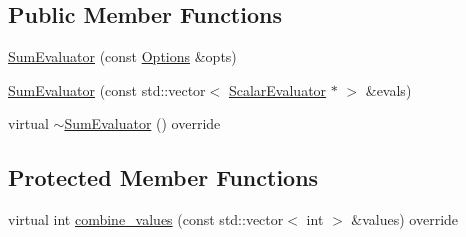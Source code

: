 \subsection*{Public Member Functions}
\begin{DoxyCompactItemize}
\item 
\hyperlink{classSumEvaluator_ad4cbe51a347eab320a300fc5cad68a56}{Sum\-Evaluator} (const \hyperlink{classOptions}{Options} \&opts)
\item 
\hyperlink{classSumEvaluator_a77e17a40880beb1b1f4611baa8440e61}{Sum\-Evaluator} (const std\-::vector$<$ \hyperlink{classScalarEvaluator}{Scalar\-Evaluator} $\ast$ $>$ \&evals)
\item 
virtual \hyperlink{classSumEvaluator_a5d15c07fc0c71355324a383e0657ffc7}{$\sim$\-Sum\-Evaluator} () override
\end{DoxyCompactItemize}
\subsection*{Protected Member Functions}
\begin{DoxyCompactItemize}
\item 
virtual int \hyperlink{classSumEvaluator_a7ce904c3d881887263f3e655304a5f6b}{combine\-\_\-values} (const std\-::vector$<$ int $>$ \&values) override
\end{DoxyCompactItemize}


